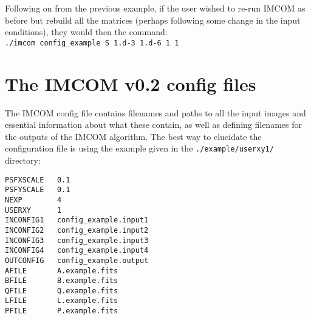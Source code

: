 \documentclass[10pt]{article}
\begin{document}
Following on from the previous example, if the user wished to re-run IMCOM as before but rebuild all the matrices (perhaps following some change in the input conditions), they would then the command:
\\ \newline
\texttt{./imcom config\_example S 1.d-3 1.d-6 1 1}

\section{The IMCOM v0.2 config files}\label{sect:config}
The IMCOM config file contains filenames and paths to all the input images and essential information about what these contain, as well as defining filenames for the outputs of the IMCOM algorithm. 
The best way to elucidate the configuration file is using the example given in the \texttt{./example/userxy1/} directory:

\texttt{PSFXSCALE~~~0.1 \\
PSFYSCALE~~~0.1 \\
NEXP~~~~~~~~4 \\
USERXY~~~~~~1 \\
INCONFIG1~~~config\_example.input1 \\
INCONFIG2~~~config\_example.input2 \\
INCONFIG3~~~config\_example.input3 \\
INCONFIG4~~~config\_example.input4 \\
OUTCONFIG~~~config\_example.output \\
AFILE~~~~~~~A.example.fits \\
BFILE~~~~~~~B.example.fits \\
QFILE~~~~~~~Q.example.fits \\
LFILE~~~~~~~L.example.fits \\
PFILE~~~~~~~P.example.fits   }
\end{document}
